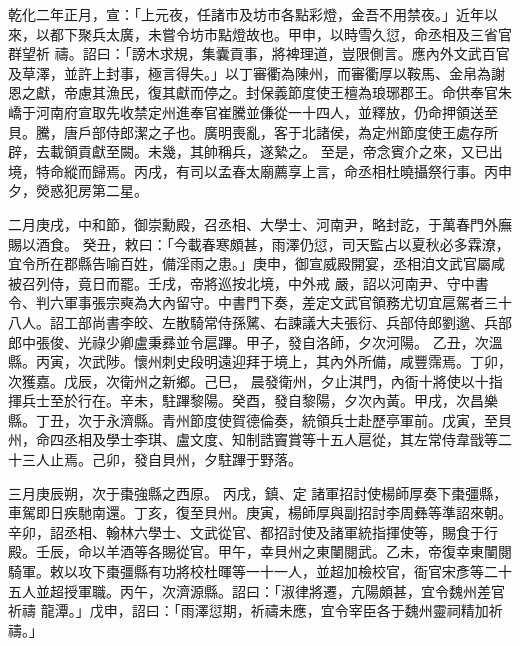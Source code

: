 
\begin{pinyinscope}

 乾化二年正月，宣：「上元夜，任諸市及坊市各點彩燈，金吾不用禁夜。」近年以來，以都下聚兵太廣，未嘗令坊市點燈故也。甲申，以時雪久愆，命丞相及三省官群望祈
 禱。詔曰：「謗木求規，集囊貢事，將裨理道，豈限側言。應內外文武百官及草澤，並許上封事，極言得失。」以丁審衢為陳州，而審衢厚以鞍馬、金帛為謝恩之獻，帝慮其漁民，復其獻而停之。封保義節度使王檀為琅琊郡王。命供奉官朱嶠于河南府宣取先收禁定州進奉官崔騰並傔從一十四人，並釋放，仍命押領送至貝。騰，唐戶部侍郎潔之子也。廣明喪亂，客于北諸侯，為定州節度使王處存所辟，去載領貢獻至闕。未幾，其帥稱兵，遂縶之。
 至是，帝念賓介之來，又已出境，特命縱而歸焉。丙戌，有司以孟春太廟薦享上言，命丞相杜曉攝祭行事。丙申夕，熒惑犯房第二星。


二月庚戌，中和節，御崇勳殿，召丞相、大學士、河南尹，略封訖，于萬春門外廡賜以酒食。
 癸丑，敕曰：「今載春寒頗甚，雨澤仍愆，司天監占以夏秋必多霖潦，宜令所在郡縣告喻百姓，備淫雨之患。」庚申，御宣威殿開宴，丞相洎文武官屬咸被召列侍，竟日而罷。壬戌，帝將巡按北境，中外戒
 嚴，詔以河南尹、守中書令、判六軍事張宗奭為大內留守。中書門下奏，差定文武官領務尤切宜扈駕者三十八人。詔工部尚書李皎、左散騎常侍孫騭、右諫議大夫張衍、兵部侍郎劉邈、兵部郎中張俊、光祿少卿盧秉彞並令扈蹕。甲子，發自洛師，夕次河陽。
 乙丑，次溫縣。丙寅，次武陟。懷州刺史段明遠迎拜于境上，其內外所備，咸豐霈焉。丁卯，次獲嘉。戊辰，次衛州之新鄉。己巳，
 晨發衛州，夕止淇門，內衙十將使以十指揮兵士至於行在。辛未，駐蹕黎陽。癸酉，發自黎陽，夕次內黃。甲戌，次昌樂縣。丁丑，次于永濟縣。青州節度使賀德倫奏，統領兵士赴歷亭軍前。戊寅，至貝州，命四丞相及學士李琪、盧文度、知制誥竇賞等十五人扈從，其左常侍韋戩等二十三人止焉。己卯，發自貝州，夕駐蹕于野落。


三月庚辰朔，次于棗強縣之西原。
 丙戌，鎮、定
 諸軍招討使楊師厚奏下棗彊縣，車駕即日疾馳南還。丁亥，復至貝州。庚寅，楊師厚與副招討李周彝等準詔來朝。辛卯，詔丞相、翰林六學士、文武從官、都招討使及諸軍統指揮使等，賜食于行殿。壬辰，命以羊酒等各賜從官。甲午，幸貝州之東闉閱武。乙未，帝復幸東闉閱騎軍。敕以攻下棗彊縣有功將校杜暉等一十一人，並超加檢校官，衙官宋彥等二十五人並超授軍職。丙午，次濟源縣。詔曰：「淑律將遷，亢陽頗甚，宜令魏州差官祈禱
 龍潭。」戊申，詔曰：「雨澤愆期，祈禱未應，宜令宰臣各于魏州靈祠精加祈禱。」



\end{pinyinscope}
